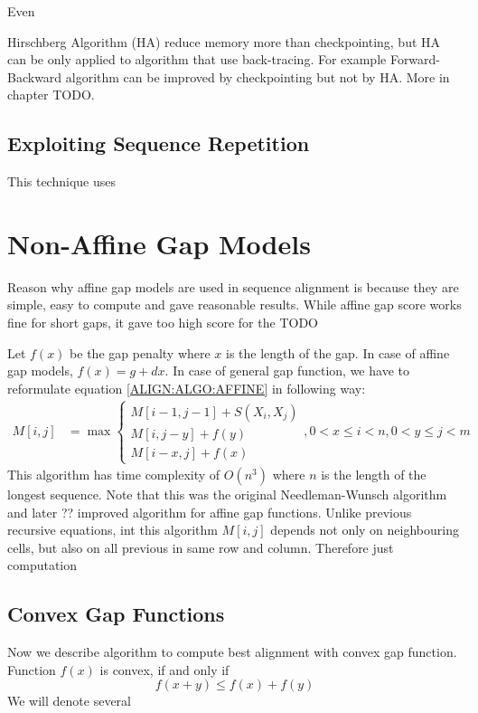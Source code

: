 Even 


Hirschberg Algorithm (HA) reduce memory more than checkpointing, but HA can be
only applied to algorithm that use back-tracing. For example Forward-Backward
algorithm can be improved by checkpointing but not by HA. More in chapter TODO.

\subsection{Exploiting Sequence Repetition}

This technique uses 

\section{Non-Affine Gap Models} 

Reason why affine gap models are used in sequence alignment is because they are
simple, easy to compute and gave reasonable results. While affine gap score
works fine for short gaps, it gave too high score for the TODO

Let $f(x)$ be the gap penalty where $x$ is the length of the gap. In case of
affine gap models, $f(x)=g+dx$. In case of general gap function, we have to
reformulate equation \ref{ALIGN:ALGO:AFFINE} in following way:
\begin{align}
M[i,j] &= \max
\begin{cases}
 M[i-1,j-1]+S(X_i,X_j)\\
 M[i,j-y]+f(y)\\
 M[i-x,j]+f(x)
\end{cases}, 0<x\leq i<n,0<y\leq j<m
\end{align}
This algorithm has time complexity of $O(n^3)$ where $n$ is the length of the
longest sequence. Note that this was the original Needleman-Wunsch\cite{}
algorithm and later ?? improved algorithm for affine gap functions\cite{}.
Unlike previous recursive equations, int this algorithm $M[i,j]$ depends not
only on neighbouring cells, but also on all previous in same row and column.
Therefore just computation 

\subsection{Convex Gap Functions}

Now we describe algorithm to compute best alignment with convex gap function.
Function $f(x)$ is convex, if and only if
\[f(x+y)\leq f(x)+f(y)\]
We will denote several 



